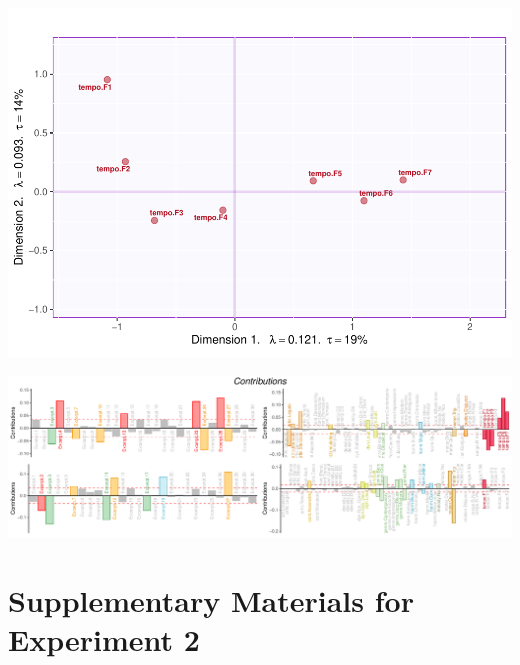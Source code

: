 \documentclass[
]{article}
\begin{document}
\includegraphics[width=0.5\linewidth]{MusDes_Supplementary_files/figure-latex/morecolmaps-11}

\begin{center}\includegraphics{MusDes_Supplementary_files/figure-latex/contributionsqsup-1} \end{center}

\hypertarget{supplementary-materials-for-experiment-2}{%
\section{Supplementary Materials for Experiment
2}\label{supplementary-materials-for-experiment-2}}
\end{document}
